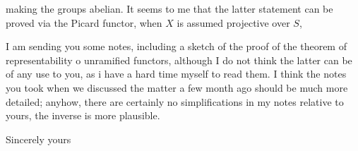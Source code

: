 making the groups abelian. It seems to me that the latter statement can be proved via the Picard functor, when $X$ is assumed projective over $S$,

I am sending you some notes, including a sketch of the proof of the theorem of representability o unramified functors, although I do not think the latter can be of any use to you, as i have a hard time myself to read them. I think the notes you took when we discussed the matter a few month ago should be much more detailed; anyhow, there are certainly no simplifications in my notes relative to yours, the inverse is more plausible.

Sincerely yours\\
